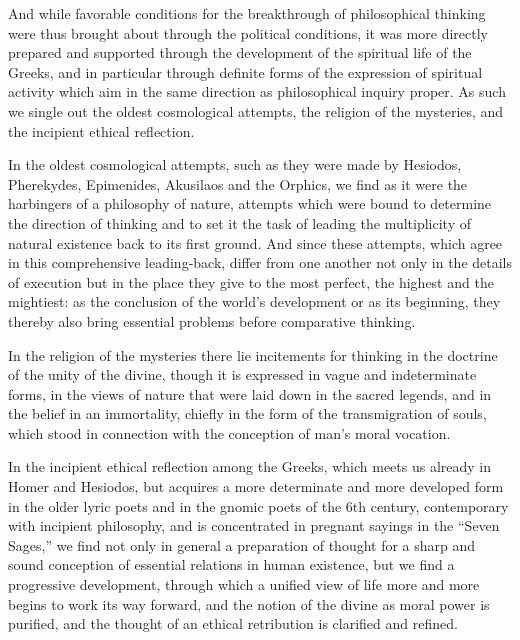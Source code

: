 And while favorable conditions for the breakthrough of philosophical thinking
were thus brought about through the political conditions, it was more directly
prepared and supported through the development of the spiritual life of the
Greeks, and in particular through definite forms of the expression of
spiritual activity which aim in the same direction as philosophical inquiry
proper. As such we single out the oldest cosmological attempts, the religion
of the mysteries, and the incipient ethical reflection.

In the oldest cosmological attempts, such as they were made by Hesiodos,
Pherekydes, Epimenides, Akusilaos and the Orphics, we find as it were the
harbingers of a philosophy of nature, attempts which were bound to determine
the direction of thinking and to set it the task of leading the multiplicity
of natural existence back to its first ground. And since these attempts, which
agree in this comprehensive leading-back, differ from one another not only in
the details of execution but in the place they give to the most
perfect, the highest and the mightiest: as the conclusion of the world's
development or as its beginning, they thereby also bring essential problems
before comparative thinking.

In the religion of the mysteries there lie incitements for thinking in the
doctrine of the unity of the divine, though it is expressed in vague and
indeterminate forms, in the views of nature that were laid down in the sacred
legends, and in the belief in an immortality, chiefly in the form of the
transmigration of souls, which stood in connection with the conception of
man's moral vocation.

In the incipient ethical reflection among the Greeks, which meets us already
in Homer and Hesiodos, but acquires a more determinate and more developed form
in the older lyric poets and in the gnomic poets of the 6th century,
contemporary with incipient philosophy, and is concentrated in pregnant
sayings in the ``Seven Sages,'' we find not only in general a preparation of
thought for a sharp and sound conception of essential relations in human
existence, but we find a progressive development, through which a unified view
of life more and more begins to work its way forward, and the notion of the
divine as moral power is purified, and the thought of an ethical retribution
is clarified and refined.

